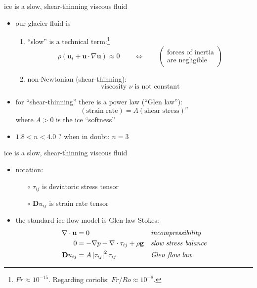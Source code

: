 \documentclass{beamer}
\begin{document}
\begin{frame}{ice is a slow, shear-thinning viscous fluid}

\begin{itemize}
\item our glacier fluid is
  \begin{enumerate}
  \item ``slow'' is a technical term:\footnote{$Fr\approx 10^{-15}$.  Regarding coriolis: $Fr/Ro \approx 10^{-8}$.}
    $$\rho \left(\mathbf{u}_t + \mathbf{u}\cdot\nabla \mathbf{u}\right) \approx 0 \qquad \iff \qquad \begin{pmatrix} \text{forces of inertia} \\ \text{are negligible} \end{pmatrix}$$
  \item non-Newtonian (shear-thinning):
    $$\text{viscosity $\nu$ is not constant}$$
  \end{enumerate}

\medskip
\item for ``shear-thinning'' there is a power law (``Glen law''):
  $$(\text{strain rate}) = A (\text{shear stress})^n$$
where $A>0$ is the ice ``softness''
\item $1.8 < n < 4.0$ ?  \quad when in doubt: \alert{$n=3$}
\end{itemize}
\end{frame}


\begin{frame}{ice is a slow, shear-thinning viscous fluid}

\begin{itemize}
\item notation:
  \begin{itemize}
  \item[$\circ$] $\tau_{ij}$ is deviatoric stress tensor
  \item[$\circ$] $\mathbf{D}u_{ij}$ is strain rate tensor
  \end{itemize}
\smallskip
\item the standard ice flow model is Glen-law Stokes:
\begin{align*}
\nabla \cdot \mathbf{u} &= 0 &&\text{\emph{incompressibility}} \\
0 &= - \nabla p + \nabla \cdot \tau_{ij} + \rho \mathbf{g} &&\text{\emph{slow stress balance}} \\
\mathbf{D}u_{ij} &= A \left|\tau_{ij}\right|^2 \tau_{ij} &&\text{\emph{Glen flow law}}
\end{align*}
\end{itemize}
\end{frame}
\end{document}
